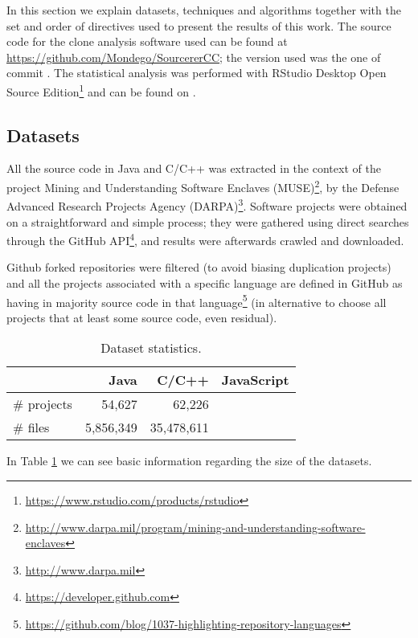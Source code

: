 In this section we explain datasets, techniques and algorithms together with the set and order of directives used to present the results of this work. The source code for the clone analysis software used can be found at \url{https://github.com/Mondego/SourcererCC}; the version used was the one of commit . The statistical analysis was performed with RStudio Desktop Open Source Edition\footnote{\url{https://www.rstudio.com/products/rstudio}} and can be found on . 

\subsection{Datasets}
All the source code in Java and C/C++ was extracted in the context of the project Mining and Understanding Software Enclaves (MUSE)\footnote{\url{http://www.darpa.mil/program/mining-and-understanding-software-enclaves}}, by the Defense Advanced Research Projects Agency (DARPA)\footnote{\url{http://www.darpa.mil}}. Software projects were obtained on a straightforward and simple process; they were gathered using direct searches through the GitHub API\footnote{\url{https://developer.github.com}}, and results were afterwards crawled and downloaded.  

Github forked repositories were filtered (to avoid biasing duplication projects) and all the projects associated with a specific language are defined in GitHub as having in majority source code in that language\footnote{\url{https://github.com/blog/1037-highlighting-repository-languages}} (in alternative to choose all projects that at least some source code, even residual). 

\begin{table}[]
\centering
\caption{Dataset statistics.}
\label{table:dataset-states}
\begin{tabular}{| l | r | r | r |} \hline
\cellcolor{black} & Java & C/C++ & JavaScript \\ \hline \hline
\# projects & 54,627 & 62,226 & \\ \hline
\# files & 5,856,349 & 35,478,611 & \\ \hline
\end{tabular}
\end{table}

In Table \ref{table:dataset-states} we can see basic information regarding the size of the datasets. 

